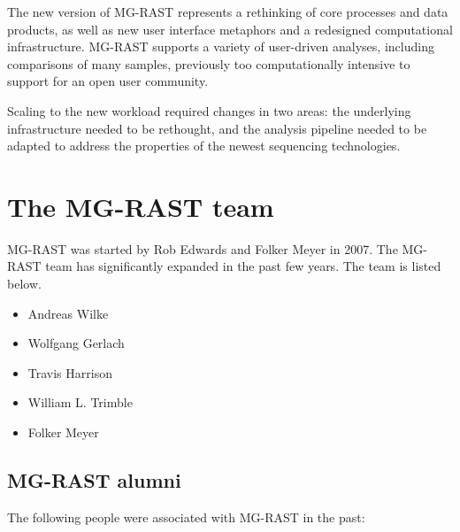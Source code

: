 \documentclass[12pt,fullpage]{report}
\begin{document}
The new version of MG-RAST represents a rethinking of core processes and data products, as well as new user interface metaphors and a redesigned computational infrastructure. MG-RAST supports a variety of user-driven analyses, including comparisons of many samples, previously too computationally intensive to support for an open user community.

Scaling to the new workload required changes in two areas: the underlying infrastructure needed to be rethought, and the analysis pipeline needed to be adapted to address the properties of the newest sequencing technologies.





\section{The MG-RAST team}
MG-RAST was started by Rob Edwards and Folker Meyer in 2007.
The MG-RAST team has significantly expanded in the past few years.
The  team is listed below.
\begin{itemize}
\item Andreas Wilke
\item Wolfgang Gerlach
\item Travis Harrison
\item William L. Trimble
\item Folker Meyer
\end{itemize}
\subsection*{MG-RAST alumni}
The following people were associated with MG-RAST in the past:
\end{document}
